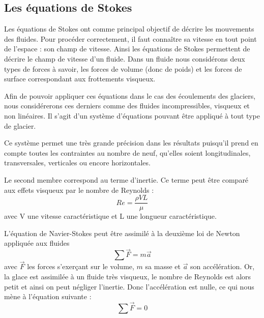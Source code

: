 \documentclass{article}
\begin{document}
\subsection{Les équations de Stokes}

Les équations de Stokes \cite{site1} ont comme principal objectif de décrire les mouvements des fluides. 
Pour procéder correctement, il faut connaître sa vitesse en tout point de l'espace : son champ de vitesse. Ainsi les équations de Stokes permettent de décrire le champ de vitesse d'un fluide. 
Dans un fluide nous considérons deux types de forces à savoir, les forces de volume (donc de poids) et les forces de surface correspondant aux frottements visqueux. 

Afin de pouvoir appliquer ces équations dans le cas des écoulements des glaciers, nous considérerons ces derniers comme des fluides incompressibles, visqueux et non linéaires. Il s'agit d'un système d'équations pouvant être appliqué à tout type de glacier.

Ce système permet une très grande précision dans les résultats puisqu'il prend en compte toutes les contraintes au nombre de neuf, qu’elles soient longitudinales, transversales, verticales ou encore horizontales. 


Le second membre correspond au terme d'inertie.  Ce terme peut être comparé aux effets visqueux par le nombre de Reynolds : 
\begin{equation}
\textit{Re} = \frac{\rho V L}{\mu}
\end{equation}
avec V une vitesse caractéristique et L une longueur caractéristique. 

L'équation de Navier-Stokes peut être assimilé à la deuxième loi de Newton appliquée aux fluides
\begin{equation}
\sum\vec{F}=m\vec{a}
\end{equation}
 avec  $\vec{F}$ les forces s'exerçant sur le volume, $m$ sa masse et  $\vec{a}$  son accélération.
Or, la glace est assimilée à un fluide très visqueux, le nombre de Reynolds est alors petit et ainsi on peut négliger l'inertie. Donc l'accélération est nulle, ce qui nous mène à l'équation suivante :
\begin{equation}
\sum\vec{F}= 0
\end{equation}


\end{document}
